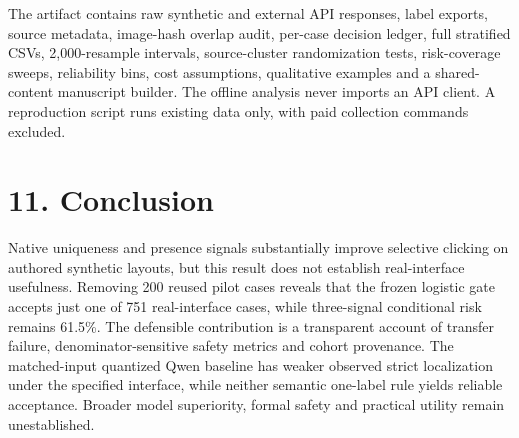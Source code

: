 \documentclass[10pt]{article}
\begin{document}
The artifact contains raw synthetic and external API responses, label exports, source metadata, image-hash overlap audit, per-case decision ledger, full stratified CSVs, 2,000-resample intervals, source-cluster randomization tests, risk-coverage sweeps, reliability bins, cost assumptions, qualitative examples and a shared-content manuscript builder. The offline analysis never imports an API client. A reproduction script runs existing data only, with paid collection commands excluded.

\section*{11. Conclusion}
Native uniqueness and presence signals substantially improve selective clicking on authored synthetic layouts, but this result does not establish real-interface usefulness. Removing 200 reused pilot cases reveals that the frozen logistic gate accepts just one of 751 real-interface cases, while three-signal conditional risk remains 61.5\%. The defensible contribution is a transparent account of transfer failure, denominator-sensitive safety metrics and cohort provenance. The matched-input quantized Qwen baseline has weaker observed strict localization under the specified interface, while neither semantic one-label rule yields reliable acceptance. Broader model superiority, formal safety and practical utility remain unestablished.
\end{document}

